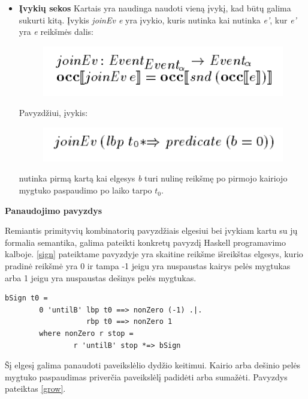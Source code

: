 \begin{itemize}
	\item \textbf{Įvykių sekos} Kartais yra naudinga naudoti vieną įvykį, kad būtų galima sukurti kitą. Įvykis \textit{joinEv e} yra įvykio, kuris nutinka kai nutinka \textit{e'}, kur \textit{e'} yra \textit{e} reikšmės dalis:

\begin{figure}[H]
	\centering
	\includegraphics[scale=0.75]{pics/14.png}
	\label{pic:14}
\end{figure}

	Pavyzdžiui, įvykis:

\begin{figure}[H]
	\centering
	\includegraphics[scale=0.75]{pics/15.png}
	\label{pic:15}
\end{figure}

	nutinka pirmą kartą kai elgesys \textit{b} turi nulinę reikšmę po pirmojo kairiojo mygtuko paspaudimo po laiko tarpo \(t_{0}\).

\end{itemize}

\textbf{Panaudojimo pavyzdys}

Remiantis primityvių kombinatorių pavyzdžiais elgesiui bei įvykiam kartu su jų formalia semantika, galima pateikti konkretų pavyzdį Haskell programavimo kalboje. \ref{sign} pateiktame pavyzdyje yra skaitine reikšme išreikštas elgesys, kurio pradinė reikšmė yra 0 ir tampa -1 jeigu yra nuspaustas kairys pelės mygtukas arba 1 jeigu yra nuspaustas dešinys pelės mygtukas.

\begin{lstlisting}[caption=- signalo funkcija nuo pelės mygtuko paspaudimo, label=sign]
	bSign t0 =
		0 'untilB' lbp t0 ==> nonZero (-1) .|.
				   rbp t0 ==> nonZero 1
		where nonZero r stop =
				r 'untilB' stop *=> bSign
\end{lstlisting}

Šį elgesį galima panaudoti paveikslėlio dydžio keitimui. Kairio arba dešinio pelės mygtuko paspaudimas priverčia paveikslėlį padidėti arba sumažėti. Pavyzdys pateiktas \ref{grow}.


